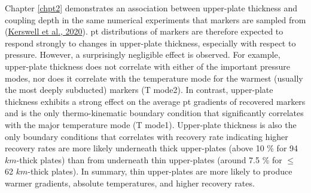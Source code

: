 Chapter \ref{chpt2} demonstrates an association between upper-plate thickness and coupling depth in the same numerical experiments that markers are sampled from (\protect\hyperlink{ref-kerswell2020}{Kerswell et al., 2020}). \gls{pt} distributions of markers are therefore expected to respond strongly to changes in upper-plate thickness, especially with respect to pressure. However, a surprisingly negligible effect is observed. For example, upper-plate thickness does not correlate with either of the important pressure modes, nor does it correlate with the temperature mode for the warmest (usually the most deeply subducted) markers (T mode2). In contrast, upper-plate thickness exhibits a strong effect on the average \gls{pt} gradients of recovered markers and is the only thermo-kinematic boundary condition that significantly correlates with the major temperature mode (T mode1). Upper-plate thickness is also the only boundary conditions that correlates with recovery rate indicating higher recovery rates are more likely underneath thick upper-plates (above 10 \% for 94 \(km\)-thick plates) than from underneath thin upper-plates (around 7.5 \% for \(\leq\) 62 \(km\)-thick plates). In summary, thin upper-plates are more likely to produce warmer gradients, absolute temperatures, and higher recovery rates.

